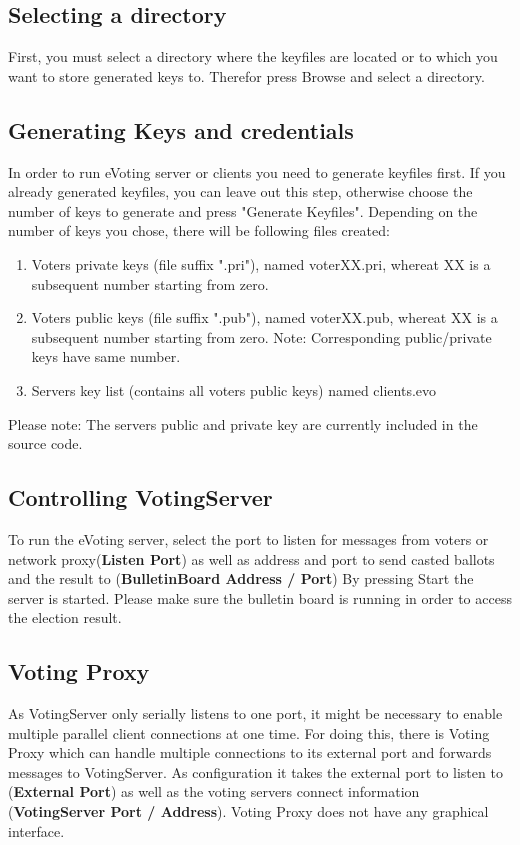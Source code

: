 \documentclass{article}
\begin{document}
\subsection{Selecting a directory}
First, you must select a directory where the keyfiles are located or to which you want to store generated keys to. Therefor press Browse and select a directory.

\subsection{Generating Keys and credentials}
In order to run eVoting server or clients you need to generate keyfiles first. If you already generated keyfiles, you can leave out this step, otherwise choose the number of keys to generate and press "Generate Keyfiles". Depending on the number of keys you chose, there will be following files created:
\begin{enumerate}
	\item Voters private keys (file suffix ".pri"), named voterXX.pri, whereat XX is a subsequent number starting from zero.
	\item Voters public keys (file suffix ".pub"), named voterXX.pub, whereat XX is a subsequent number starting from zero. Note: Corresponding public/private keys have same number.
	\item Servers key list (contains all voters public keys) named clients.evo
\end{enumerate}
Please note: The servers public and private key are currently included in the source code.

\subsection{Controlling VotingServer}
To run the eVoting server, select the port to listen for messages from voters or network proxy(\textbf{Listen Port}) as well as address and port to send casted ballots and the result to (\textbf{BulletinBoard Address / Port})
By pressing Start the server is started. Please make sure the bulletin board is running in order to access the election result.

\subsection{Voting Proxy}
As VotingServer only serially listens to one port, it might be necessary to enable multiple parallel client connections at one time. For doing this, there is Voting Proxy which can handle multiple connections to its external port and forwards messages to VotingServer. As configuration it takes the external port to listen to (\textbf{External Port}) as well as the voting servers connect information (\textbf{VotingServer Port / Address}). Voting Proxy does not have any graphical interface.
\end{document}
